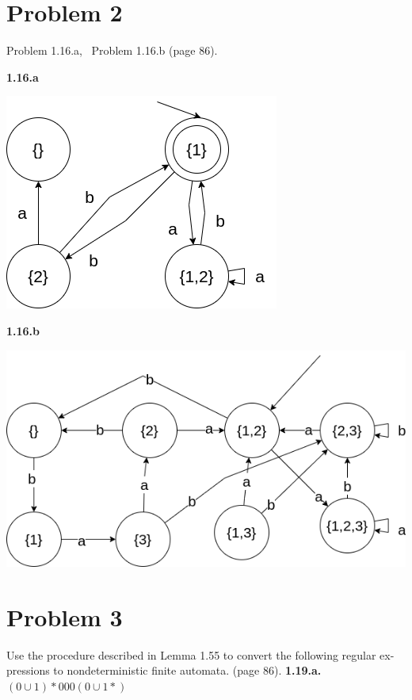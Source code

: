 \documentclass[11pt]{article}
\begin{document}
\newpage
\section*{Problem 2}

Problem 1.16.a, ~Problem 1.16.b (page 86).

\textbf{1.16.a}
\begin{center}
\includegraphics[scale=0.7]{02/HW02-1.16.a.png}    
\end{center}
\textbf{1.16.b}
\begin{center}
\includegraphics[scale=0.7]{02/HW02-1.16.b.png}    
\end{center}
\newpage
\section*{Problem 3}

Use the procedure described in Lemma 1.55 to convert the following regular ex-
pressions to nondeterministic finite automata. (page 86).
\newline
\newline
\textbf{1.19.a.} $(0\cup1)*000(0\cup1*)$
\end{document}

